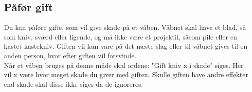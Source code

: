 \subsection*{Påfør gift}
Du kan påføre gifte, som vil give skade på et våben. Våbnet skal have et blad, så som kniv, sværd eller ligende, og må ikke være et projektil, såsom pile eller en kastet kastekniv. Giften vil kun vare på det næste slag eller til våbnet gives til en anden person, hvor efter giften vil forsvinde.\\
Når et våben bruges på denne måde skal ordene: "Gift kniv x i skade" siges. Her vil x være hvor meget skade du giver med giften. Skulle giften have andre effekter end skade skal disse ikke siges da de ignoreres.